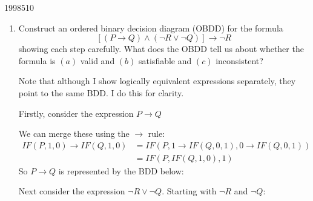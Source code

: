 \documentclass[10pt,\jkfside,a4paper]{article}
\begin{document}
\begin{examquestion}{1998}{5}{10}

\begin{enumerate}

\item Construct an ordered binary decision diagram (OBDD) for the formula
\[
\left[ \left( P \to Q \right) \wedge \left( \neg R \vee \neg Q \right)
\right] \to \neg R
\]
showing each step carefully. What does the OBDD tell us about whether the
formula is $(a)$ valid and $(b)$ satisfiable and $(c)$ inconsistent?

Note that although I show logically equivalent expressions separately, they
point to the same BDD\@. I do this for clarity.

Firstly, consider the expression $P \to Q$
\begin{center}
\hspace{1cm}
\end{center}
We can merge these using the $\to$ rule:
\begin{align*}
IF(P, 1, 0) \to IF(Q, 1, 0)
&= IF(P, 1 \to IF(Q, 0, 1), 0 \to IF(Q, 0, 1)) \\
&= IF(P, IF(Q, 1, 0), 1)
\end{align*}
So $P \to Q$ is represented by the BDD below:
\begin{center}
\end{center}
Next consider the expression $\neg R \vee \neg Q$. Starting with $\neg R$
and $\neg Q$:
\begin{center}
\end{center}
\end{enumerate}
\end{examquestion}
\end{document}
